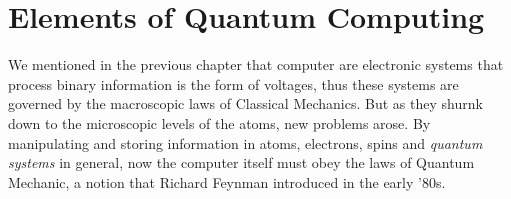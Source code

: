 \chapter{Elements of Quantum Computing}

We mentioned in the previous chapter that computer are electronic systems that process binary information
is the form of voltages, thus these systems are governed by the macroscopic laws of 
Classical Mechanics. But as they shurnk down to the microscopic levels of the atoms,
new problems arose. By manipulating and storing information in atoms, electrons, spins
and \textit{quantum systems} in general, now the computer itself must obey the laws
of Quantum Mechanic, a notion that Richard Feynman introduced in the early '80s.







